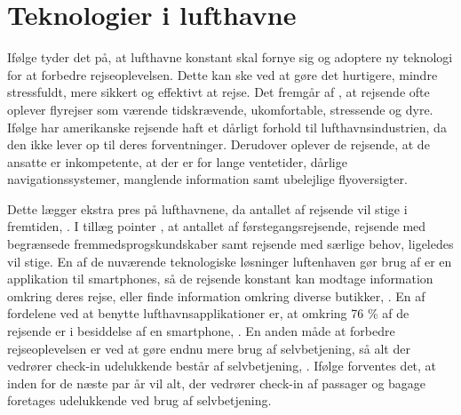 \section{Teknologier i lufthavne}
\label{Lufthavne}
%
Ifølge \textcite[s. 203]{PDF:FutureAirportTerminals} tyder det på, at lufthavne konstant skal fornye sig og adoptere ny teknologi for at forbedre rejseoplevelsen. Dette kan ske ved at gøre det hurtigere, mindre stressfuldt, mere sikkert og effektivt at rejse. Det fremgår af \textcite[s. 203]{PDF:FutureAirportTerminals}, at rejsende ofte oplever flyrejser som værende tidskrævende, ukomfortable, stressende og dyre. Ifølge \textcite[s. 351]{PDF:TheImpactOfTraveler} har amerikanske rejsende haft et dårligt forhold til lufthavnsindustrien, da den ikke lever op til deres forventninger. Derudover oplever de rejsende, at de ansatte er inkompetente, at der er for lange ventetider, dårlige navigationssystemer, manglende information samt ubelejlige flyoversigter. 

Dette lægger ekstra pres på lufthavnene, da antallet af rejsende vil stige i fremtiden, \parencite[s. 203]{PDF:FutureAirportTerminals}. I tillæg pointer \textcite[s. 609]{PDF:SpencerProject}, at antallet af førstegangsrejsende, rejsende med begrænsede fremmedsprogskundskaber samt rejsende med særlige behov, ligeledes vil stige. En af de nuværende teknologiske løsninger luftenhaven gør brug af er en applikation til smartphones, så de rejsende konstant kan modtage information omkring deres rejse, eller finde information omkring diverse butikker, \parencite[s. 203]{PDF:FutureAirportTerminals}. En af fordelene ved at benytte lufthavnsapplikationer er, at omkring 76 \% af de rejsende er i besiddelse af en smartphone, \parencite[s. 203]{PDF:FutureAirportTerminals}. En anden måde at forbedre rejseoplevelsen er ved at gøre endnu mere brug af selvbetjening, så alt der vedrører check-in udelukkende består af selvbetjening, \parencite[s. 205]{PDF:FutureAirportTerminals}. Ifølge \textcite[s. 351]{PDF:TheImpactOfTraveler} forventes det, at inden for de næste par år vil alt, der vedrører check-in af passager og bagage foretages udelukkende ved brug af selvbetjening. 


